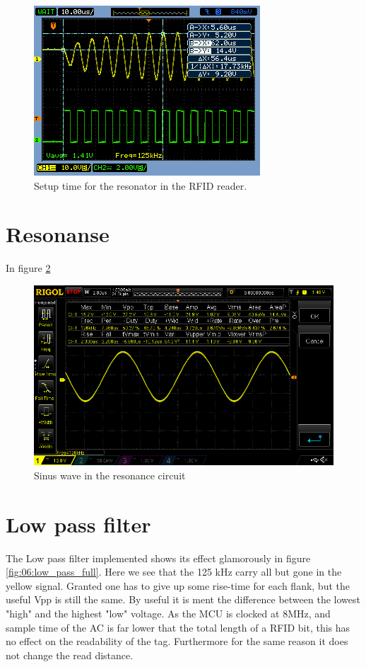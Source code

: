 \begin{figure}[H]
    \centering
    \includegraphics{06_My_Testing_Results/figures/125khz_from_mcu/resonator_startup.png}
    \caption{Setup time for the resonator in the RFID reader.}
    \label{fig:06:125khz:setup}
\end{figure}
\newpage
\section{Resonanse}
In figure \ref{fig:06:SinusVpp}
\begin{figure}[H]
    \centering
    \includegraphics[width=\textwidth]{06_My_Testing_Results/figures/Out_from_transistor/125kHz_resonance_25Vpp.png}
    \caption{Sinus wave in the resonance circuit }
    \label{fig:06:SinusVpp}
\end{figure}

\section{Low pass filter}
The Low pass filter implemented shows its effect glamorously in figure \ref{fig:06:low_pass_full}. Here we see that the 125 kHz carry all but gone in the yellow signal. Granted one has to give up some rise-time for each flank, but the useful Vpp is still the same. By useful it is ment the difference between the lowest "high" and the highest "low" voltage. As the MCU is clocked at 8MHz, and sample time of the AC is far lower that the total length of a RFID bit, this has no effect on the readability of the tag. Furthermore for the same reason it does not change the read distance.

